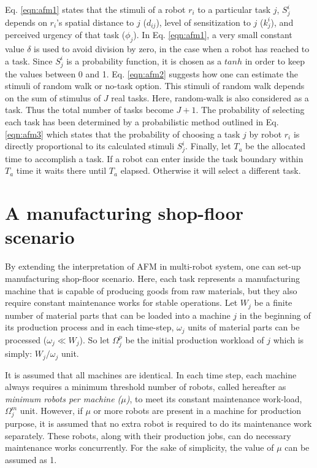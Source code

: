 Eq. \ref{eqn:afm1} states that the stimuli of a robot $r_i$ to a particular task $j$, $S^{i}_{j}$ depends on $r_i$'s spatial distance to $j$ ($d_{ij}$), level of sensitization to $j$ ($k_{j}^{i}$), and perceived urgency of that task ($\phi _{j}$). In  Eq. \ref{eqn:afm1},  a very small constant value $\delta$ is used to avoid division by zero, in the case when a robot has reached to a task. Since $S^{i}_{j}$ is a probability function, it is chosen as a $tanh$ in order to keep the values between 0 and 1. Eq. \ref{eqn:afm2} suggests how  one can estimate the stimuli of random walk or no-task option. This stimuli of random walk depends on the sum of stimulus of $J$ real tasks. Here, random-walk is also considered as a task. Thus the total number of tasks become $J+1$. The probability of selecting each task has been determined by a probabilistic method outlined in Eq. \ref{eqn:afm3} which states that the probability of choosing a task $j$ by robot $r_i$ is directly proportional to its calculated stimuli $ S^i_j$. Finally, let $T_a$ be the allocated time to accomplish a task. If a robot can enter inside the task boundary within $T_a$ time it waits there until $T_a$ elapsed. Otherwise it will select a different task.
\section{A manufacturing shop-floor scenario}
\label{afm:vms}
By extending the interpretation of AFM in multi-robot system, one can set-up manufacturing shop-floor  scenario. Here, each task represents a manufacturing machine that is  capable of producing goods from raw materials, but they also require constant maintenance works for stable operations. Let $W_{j}$ be a finite number of material parts that can be loaded into a machine $j$ in the beginning of its production process and in each time-step, $\omega_{j}$ units of material parts can be processed  ($\omega_{j} \ll W_{j} $). So let $\Omega_{j}^{p}$ be the initial production workload of $j$ which is simply: $W_{j} / \omega_{j}$ unit.

It is assumed that all machines are identical. In each time step, each machine always requires a minimum threshold number of robots, called hereafter as {\em minimum robots per machine ($\mu$)}, to meet its constant maintenance work-load, $\Omega_{j}^{m}$ unit. However, if $\mu$ or more robots are present in a machine for production purpose, it is assumed that no extra robot is required to do its maintenance work separately. These robots, along with their production jobs, can do necessary maintenance works concurrently. For the sake of simplicity, the value of $\mu$ can be assumed as 1.

